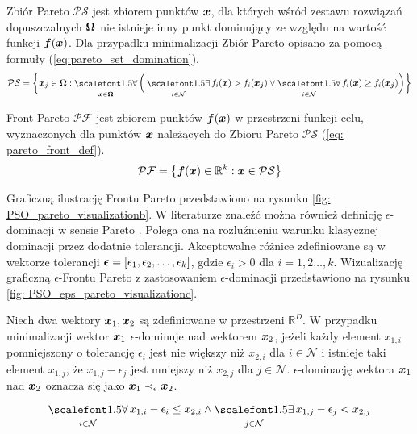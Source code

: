 \begin{definition}
	Zbiór Pareto $\mathcal{PS}$ jest zbiorem punktów $\bm{x}$, dla których wśród zestawu rozwiązań dopuszczalnych $\bm{\Omega}$ nie istnieje inny punkt dominujący ze względu na wartość funkcji $\bm{f}(\bm{x})$. Dla przypadku minimalizacji Zbiór Pareto opisano za pomocą formuły (\ref{eq:pareto_set_domination}). 
	\begin{equation} \label{eq:pareto_set_domination}
		\mathcal{PS} = \bigg\{ 
		\vect{x}_j \in \vect{\Omega}: 
		\bigforall_{\vect{x}\in\vect{\Omega}} \bigg( 
		\bigexists_{i\in\mathcal{N}} f_i(\vect{x})>f_i(\vect{x_j}) \vee
		\bigforall_{i\in\mathcal{N}} f_i(\vect{x})\ge f_i(\vect{x_j})
		\bigg) \bigg\}   
	\end{equation}
\end{definition}
\begin{definition}
	Front Pareto $\mathcal{PF}$ jest zbiorem punktów $\bm{f}(\bm{x})$ w przestrzeni funkcji celu, wyznaczonych dla punktów $\bm{x}$ należących do Zbioru Pareto $\mathcal{PS}$ (\ref{eq: pareto_front_def}).
	\begin{equation} \label{eq: pareto_front_def}
		\mathcal{PF} = \big\{ \bm{f}(\bm{x}) \in \mathbb{R}^k: \bm{x}\in \mathcal{PS} \big\}  
	\end{equation}
\end{definition}
Graficzną ilustrację Frontu Pareto przedstawiono na rysunku \ref{fig: PSO_pareto_visualizationb}.
W literaturze znaleźć można również definicję $\epsilon$-dominacji w sensie Pareto \parencite{Zuluaga2016}. Polega ona na rozluźnieniu warunku klasycznej dominacji przez dodatnie tolerancji. Akceptowalne różnice zdefiniowane są w wektorze tolerancji $\bm{\epsilon}=[\epsilon_1,\epsilon_2,\dots,\epsilon_k]$, gdzie $\epsilon_i>0$ dla $i=1,2\dots,k$. Wizualizację graficzną $\epsilon$-Frontu Pareto z zastosowaniem $\epsilon$-dominacji przedstawiono na rysunku \ref{fig: PSO_eps_pareto_visualizationc}.

\begin{definition}
	Niech dwa wektory $\bm{x}_1, \bm{x}_2$ są zdefiniowane w przestrzeni $\mathbb{R}^D$. W przypadku minimalizacji wektor $\bm{x}_1$ $\epsilon$-dominuje nad wektorem $\bm{x}_2$, jeżeli każdy element $x_{1,i}$ pomniejszony o tolerancję $\epsilon_i$ jest nie większy niż $x_{2,i}$ dla $i\in \mathcal{N}$ i istnieje taki element $x_{1,j}$, że $x_{1,j}-\epsilon_j$ jest mniejszy niż $x_{2,j}$ dla $j\in\mathcal{N}$. $\epsilon$-dominację wektora $\bm{x}_1$ nad $\bm{x}_2$ oznacza się jako $\bm{x}_1\prec_\epsilon\bm{x}_2$.
	\begin{equation}
		\bigforall_{i\in\mathcal{N}} x_{1,i}-\epsilon_i\le x_{2,i} \land \bigexists_{j\in\mathcal{N}} x_{1,j}-\epsilon_j<x_{2,j}
	\end{equation}
\end{definition}



